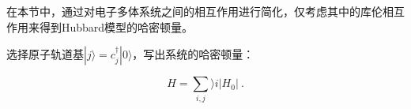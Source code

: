 
在本节中，通过对电子多体系统之间的相互作用进行简化，仅考虑其中的库伦相互作用来得到Hubbard模型的哈密顿量。

选择原子轨道基$|j\rangle =c_j^\dagger |0\rangle$，写出系统的哈密顿量：

\begin{equation}
H=\sum\limits_{i,j}\rangle i |H_0|~.
\end{equation}

